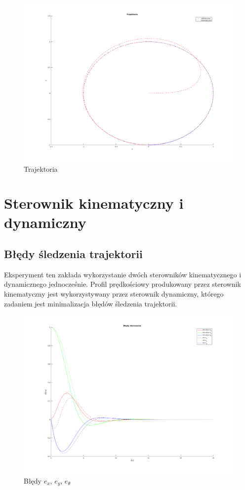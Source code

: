 \documentclass[12pt,a4paper]{article}
\begin{document}
  \begin{figure}[H]
    \centering
    \includegraphics[width=1\textwidth]{figures/kin_trajektoria.png}
    \caption{Trajektoria}
    \label{fig:2}
  \end{figure}


\section{Sterownik kinematyczny i dynamiczny}

  \subsection{Błędy śledzenia trajektorii}
    Eksperyment ten zakłada wykorzystanie dwóch sterowników kinematycznego i dynamicznego jednocześnie. Profil prędkościowy produkowany przez sterownik kinematyczny jest wykorzystywany przez sterownik dynamiczny, którego zadaniem jest minimalizacja błędów śledzenia trajektorii.

    \begin{figure}[H]
      \centering
      \includegraphics[width=1\textwidth]{figures/dyn_bledy.png}
      \caption{Błędy $e_x$, $e_y$, $e_\theta$}
      \label{fig:3}
    \end{figure}
\end{document}
